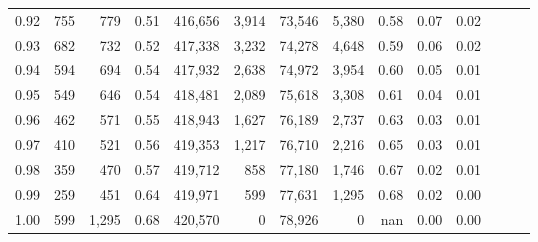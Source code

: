 \begin{tabular}{rrrrrrrrrrrrrr}
0.92 &    755 &    779 &  0.51 &  416,656 &    3,914 &  73,546 &   5,380 &  0.58 &  0.07 &      0.02 \\
0.93 &    682 &    732 &  0.52 &  417,338 &    3,232 &  74,278 &   4,648 &  0.59 &  0.06 &      0.02 \\
0.94 &    594 &    694 &  0.54 &  417,932 &    2,638 &  74,972 &   3,954 &  0.60 &  0.05 &      0.01 \\
0.95 &    549 &    646 &  0.54 &  418,481 &    2,089 &  75,618 &   3,308 &  0.61 &  0.04 &      0.01 \\
0.96 &    462 &    571 &  0.55 &  418,943 &    1,627 &  76,189 &   2,737 &  0.63 &  0.03 &      0.01 \\
0.97 &    410 &    521 &  0.56 &  419,353 &    1,217 &  76,710 &   2,216 &  0.65 &  0.03 &      0.01 \\
0.98 &    359 &    470 &  0.57 &  419,712 &      858 &  77,180 &   1,746 &  0.67 &  0.02 &      0.01 \\
0.99 &    259 &    451 &  0.64 &  419,971 &      599 &  77,631 &   1,295 &  0.68 &  0.02 &      0.00 \\
1.00 &    599 &  1,295 &  0.68 &  420,570 &        0 &  78,926 &       0 &   nan &  0.00 &      0.00 \\
\bottomrule
\end{tabular}
